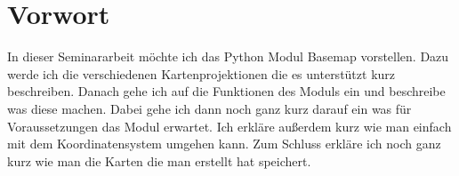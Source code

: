 \section{Vorwort}
\label{sec:vor}
In dieser Seminararbeit möchte ich das Python Modul \textsf{Basemap} vorstellen. Dazu werde ich die verschiedenen Kartenprojektionen die es unterstützt kurz beschreiben. Danach gehe ich auf die Funktionen des Moduls ein und beschreibe was diese machen. Dabei gehe ich dann noch ganz kurz darauf ein was für Voraussetzungen das Modul erwartet. Ich erkläre außerdem kurz wie man einfach mit dem Koordinatensystem umgehen kann. Zum Schluss erkläre ich noch ganz kurz wie man die Karten die man erstellt hat speichert.